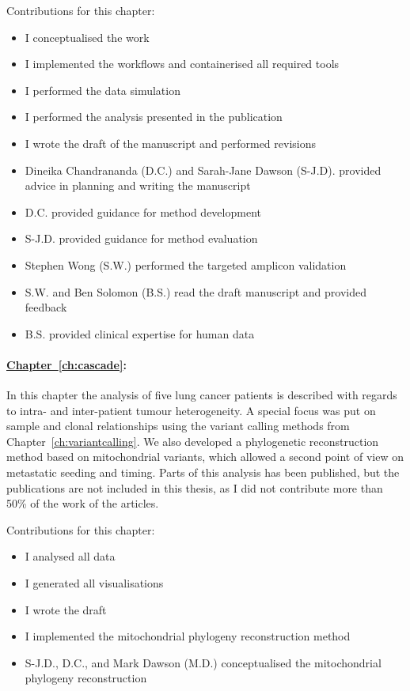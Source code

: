 {Contributions for this chapter:
\begin{itemize}
	\item I conceptualised the work
	\item I implemented the workflows and containerised all required tools
	\item I performed the data simulation
	\item I performed the analysis presented in the publication
	
	\item I wrote the draft of the manuscript and performed revisions
	\item Dineika Chandrananda (D.C.) and Sarah-Jane Dawson (S-J.D). provided advice in planning and writing the manuscript
	\item D.C. provided guidance for method development
	\item S-J.D. provided guidance for method evaluation
	\item Stephen Wong (S.W.) performed the targeted amplicon validation
	\item S.W. and  Ben Solomon (B.S.) read the draft manuscript and provided feedback
	\item B.S. provided clinical expertise for human data
	
\end{itemize}



\paragraph*{\hyperref[ch:cascade]{Chapter~\ref*{ch:cascade}}:} 
In this chapter the analysis of five lung cancer patients is described with regards to intra- and inter-patient tumour heterogeneity. A special focus was put on sample and clonal relationships using the variant calling methods from Chapter~\ref*{ch:variantcalling}. We also developed a phylogenetic reconstruction method based on mitochondrial variants, which allowed a second point of view on metastatic seeding and timing. Parts of this analysis has been published\cite{Burr2019,Solomon2020}, but the publications are not included in this thesis, as I did not contribute more than 50\% of the work of the articles. 


Contributions for this chapter:
\begin{itemize}
	\item I analysed all data
	\item I generated all visualisations
	\item I wrote the draft
	\item I implemented the mitochondrial phylogeny reconstruction method
	\item S-J.D., D.C., and Mark Dawson (M.D.) conceptualised the mitochondrial phylogeny reconstruction
	

\end{itemize}}
